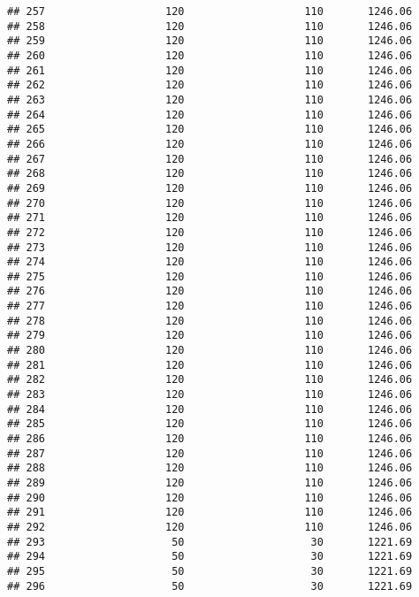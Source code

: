 \documentclass[]{article}
\begin{document}
\begin{verbatim}
## 257                   120                   110       1246.06
## 258                   120                   110       1246.06
## 259                   120                   110       1246.06
## 260                   120                   110       1246.06
## 261                   120                   110       1246.06
## 262                   120                   110       1246.06
## 263                   120                   110       1246.06
## 264                   120                   110       1246.06
## 265                   120                   110       1246.06
## 266                   120                   110       1246.06
## 267                   120                   110       1246.06
## 268                   120                   110       1246.06
## 269                   120                   110       1246.06
## 270                   120                   110       1246.06
## 271                   120                   110       1246.06
## 272                   120                   110       1246.06
## 273                   120                   110       1246.06
## 274                   120                   110       1246.06
## 275                   120                   110       1246.06
## 276                   120                   110       1246.06
## 277                   120                   110       1246.06
## 278                   120                   110       1246.06
## 279                   120                   110       1246.06
## 280                   120                   110       1246.06
## 281                   120                   110       1246.06
## 282                   120                   110       1246.06
## 283                   120                   110       1246.06
## 284                   120                   110       1246.06
## 285                   120                   110       1246.06
## 286                   120                   110       1246.06
## 287                   120                   110       1246.06
## 288                   120                   110       1246.06
## 289                   120                   110       1246.06
## 290                   120                   110       1246.06
## 291                   120                   110       1246.06
## 292                   120                   110       1246.06
## 293                    50                    30       1221.69
## 294                    50                    30       1221.69
## 295                    50                    30       1221.69
## 296                    50                    30       1221.69

\end{verbatim}
\end{document}
